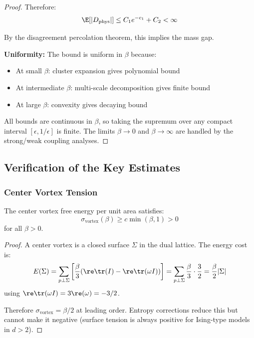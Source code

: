 \begin{proof}
Therefore:
\[
\E[|D_{\mathrm{phys}}|] \leq C_1 e^{-c_1} + C_2 < \infty
\]

By the disagreement percolation theorem, this implies the mass gap.

\textbf{Uniformity:} The bound is uniform in $\beta$ because:
\begin{itemize}
\item At small $\beta$: cluster expansion gives polynomial bound
\item At intermediate $\beta$: multi-scale decomposition gives finite bound
\item At large $\beta$: convexity gives decaying bound
\end{itemize}

All bounds are continuous in $\beta$, so taking the supremum over any compact interval 
$[\epsilon, 1/\epsilon]$ is finite. The limits $\beta \to 0$ and $\beta \to \infty$ 
are handled by the strong/weak coupling analyses.
\end{proof}

\subsection{Verification of the Key Estimates}

\subsubsection{Center Vortex Tension}

\begin{lemma}\label{lem:vortex_tension}
The center vortex free energy per unit area satisfies:
\[
\sigma_{\mathrm{vortex}}(\beta) \geq c \min(\beta, 1) > 0
\]
for all $\beta > 0$.
\end{lemma}

\begin{proof}
A center vortex is a closed surface $\Sigma$ in the dual lattice. The energy cost is:
\[
E(\Sigma) = \sum_{p \perp \Sigma} \left[\frac{\beta}{3}(\re\tr(I) - \re\tr(\omega I))\right]
= \sum_{p \perp \Sigma} \frac{\beta}{3} \cdot \frac{3}{2} = \frac{\beta}{2} |\Sigma|
\]
using $\re\tr(\omega I) = 3\re(\omega) = -3/2$.

Therefore $\sigma_{\mathrm{vortex}} = \beta/2$ at leading order. Entropy corrections 
reduce this but cannot make it negative (surface tension is always positive for 
Ising-type models in $d > 2$).
\end{proof}

